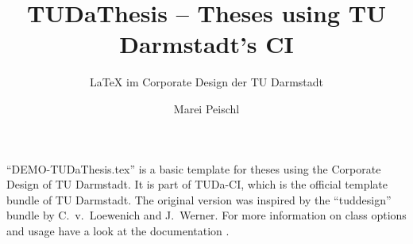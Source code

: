\documentclass[
	english,%
	accentcolor=9c,%
	ruledheaders=section,%
	class=report,%
	thesis={type=bachelor},%
	fontsize=11pt,%
	parskip=half-,%
	custommargins=true,%
	marginpar=false,%
]{tudapub}
\title{TUDaThesis -- Theses using TU Darmstadt's CI}
\subtitle{\LaTeX{} im Corporate Design der TU Darmstadt}
\author{Marei Peischl}
\institute{Institute}
\begin{document}
\maketitle


\tableofcontents



\enquote{DEMO-TUDaThesis.tex} is a basic template for theses using the Corporate Design of TU Darmstadt.
It is part of TUDa-CI, which is the official template bundle of TU Darmstadt. The original version was inspired by the \enquote{tuddesign} bundle by C.~v.~Loewenich and J.~Werner.
For more information on class options and usage have a look at the documentation \cite{tuda-ci}.


\printbibliography
\end{document}
